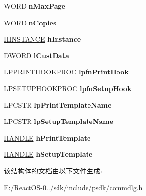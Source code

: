 \begin{DoxyCompactItemize}
W\+O\+RD {\bfseries n\+Max\+Page}
\item 
\mbox{\label{structtag_p_d_a_a7dc466602d9c68b4a7cd5812a1998f49}} 
W\+O\+RD {\bfseries n\+Copies}
\item 
\mbox{\label{structtag_p_d_a_a71023cb3ba08b915debd83c8e0e6a063}} 
\hyperlink{interfacevoid}{H\+I\+N\+S\+T\+A\+N\+CE} {\bfseries h\+Instance}
\item 
\mbox{\label{structtag_p_d_a_a83116bf590374e45dfc23e6e9c94767b}} 
D\+W\+O\+RD {\bfseries l\+Cust\+Data}
\item 
\mbox{\label{structtag_p_d_a_a859fa083095483293bfef134bbaf9ab7}} 
L\+P\+P\+R\+I\+N\+T\+H\+O\+O\+K\+P\+R\+OC {\bfseries lpfn\+Print\+Hook}
\item 
\mbox{\label{structtag_p_d_a_af10684d0ecf491ed7dcf24d3390983d8}} 
L\+P\+S\+E\+T\+U\+P\+H\+O\+O\+K\+P\+R\+OC {\bfseries lpfn\+Setup\+Hook}
\item 
\mbox{\label{structtag_p_d_a_a6bca1f342f2c674784ddbdb4e391daae}} 
L\+P\+C\+S\+TR {\bfseries lp\+Print\+Template\+Name}
\item 
\mbox{\label{structtag_p_d_a_a99a2a6b023faf6f4869e5e3e89ea2391}} 
L\+P\+C\+S\+TR {\bfseries lp\+Setup\+Template\+Name}
\item 
\mbox{\label{structtag_p_d_a_a2c6edcbf63f0b45d110b09a1530724cd}} 
\hyperlink{interfacevoid}{H\+A\+N\+D\+LE} {\bfseries h\+Print\+Template}
\item 
\mbox{\label{structtag_p_d_a_a60d64d27159eb04963a4c46f8b68b613}} 
\hyperlink{interfacevoid}{H\+A\+N\+D\+LE} {\bfseries h\+Setup\+Template}
\end{DoxyCompactItemize}


该结构体的文档由以下文件生成\+:\begin{DoxyCompactItemize}
\item 
E\+:/\+React\+O\+S-\/0../sdk/include/psdk/commdlg.\+h\end{DoxyCompactItemize}
